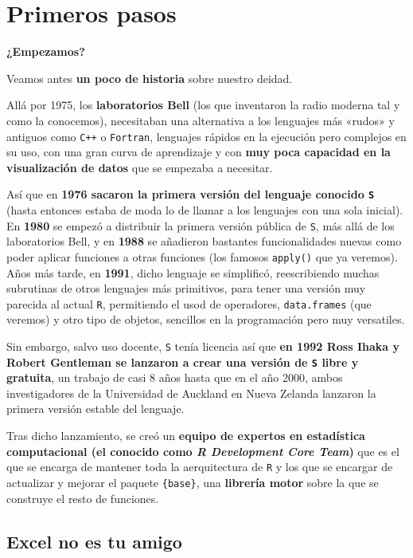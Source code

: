 \documentclass[11pt,]{book}
\begin{document}
\hypertarget{primeros-pasos}{%
\chapter{Primeros pasos}\label{primeros-pasos}}

\textbf{¿Empezamos?}

Veamos antes \textbf{un poco de historia} sobre nuestro deidad.

Allá por 1975, los \textbf{laboratorios Bell} (los que inventaron la radio moderna tal y como la conocemos), necesitaban una alternativa a los lenguajes más «rudos» y antiguos como \texttt{C++} o \texttt{Fortran}, lenguajes rápidos en la ejecución pero complejos en su uso, con una gran curva de aprendizaje y con \textbf{muy poca capacidad en la visualización de datos} que se empezaba a necesitar.

Así que en \textbf{1976 sacaron la primera versión del lenguaje conocido \texttt{S}} (hasta entonces estaba de moda lo de llamar a los lenguajes con una sola inicial). En \textbf{1980} se empezó a distribuir la primera versión pública de \texttt{S}, más allá de los laboratorios Bell, y en \textbf{1988} se añadieron bastantes funcionalidades nuevas como poder aplicar funciones a otras funciones (los famosos \texttt{apply()} que ya veremos). Años más tarde, en \textbf{1991}, dicho lenguaje se simplificó, reescribiendo muchas subrutinas de otros lenguajes más primitivos, para tener una versión muy parecida al actual \texttt{R}, permitiendo el usod de operadores, \texttt{data.frames} (que veremos) y otro tipo de objetos, sencillos en la programación pero muy versatiles.

Sin embargo, salvo uso docente, \texttt{S} tenía licencia así que \textbf{en 1992 Ross Ihaka y Robert Gentleman se lanzaron a crear una versión de \texttt{S} libre y gratuita}, un trabajo de casi 8 años hasta que en el año 2000, ambos investigadores de la Universidad de Auckland en Nueva Zelanda lanzaron la primera versión estable del lenguaje.

Tras dicho lanzamiento, se creó un \textbf{equipo de expertos en estadística computacional (el conocido como \emph{R Development Core Team})} que es el que se encarga de mantener toda la aerquitectura de \texttt{R} y los que se encargar de actualizar y mejorar el paquete \texttt{\{base\}}, una \textbf{librería motor} sobre la que se construye el resto de funciones.

\hypertarget{excel-no-es-tu-amigo}{%
\section{Excel no es tu amigo}\label{excel-no-es-tu-amigo}}
\end{document}
